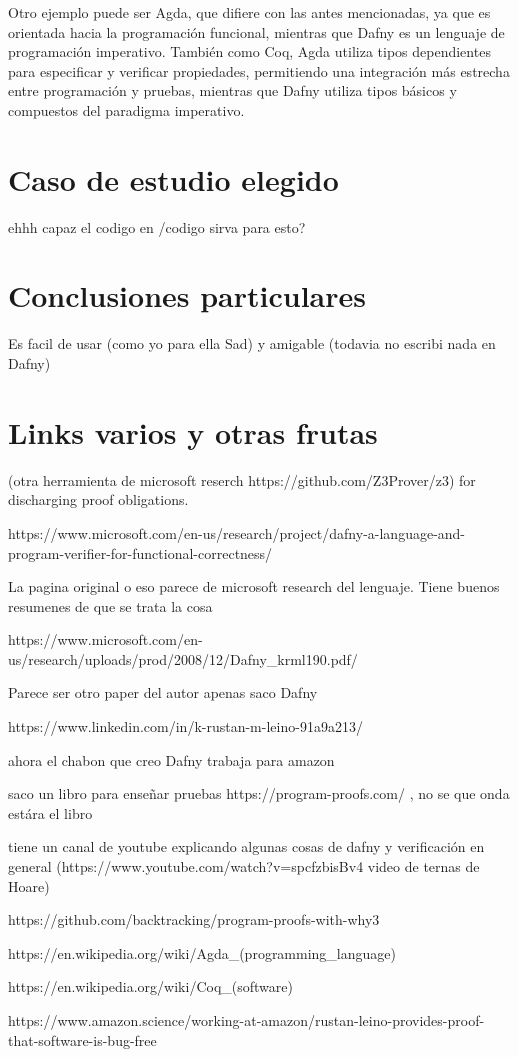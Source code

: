 \documentclass[runningheads]{llncs}
\begin{document}
Otro ejemplo puede ser Agda, que difiere con las antes mencionadas, ya que 
es orientada hacia la programación funcional, mientras que Dafny es un lenguaje de programación imperativo. 
También como Coq, Agda utiliza tipos dependientes para especificar y verificar propiedades, 
permitiendo una integración más estrecha entre programación y pruebas, mientras que Dafny utiliza tipos básicos y compuestos del paradigma imperativo.

\section{Caso de estudio elegido}
ehhh capaz el codigo en /codigo sirva para esto?

\section{Conclusiones particulares}
Es facil de usar (como yo para ella Sad) y amigable (todavia no escribi nada en Dafny)

\section{Links varios y otras frutas}
(otra herramienta de microsoft reserch https://github.com/Z3Prover/z3) for discharging proof obligations.

https://www.microsoft.com/en-us/research/project/dafny-a-language-and-program-verifier-for-functional-correctness/

La pagina original o eso parece de microsoft research del lenguaje. Tiene buenos resumenes de que se trata la cosa

https://www.microsoft.com/en-us/research/uploads/prod/2008/12/Dafny\_krml190.pdf/

Parece ser otro paper del autor apenas saco Dafny

https://www.linkedin.com/in/k-rustan-m-leino-91a9a213/

ahora el chabon que creo Dafny trabaja para amazon

saco un libro para enseñar pruebas https://program-proofs.com/ , no se que onda estára el libro

tiene un canal de youtube explicando algunas cosas de dafny y verificación en general (https://www.youtube.com/watch?v=spcfzbisBv4 video de ternas de Hoare)

https://github.com/backtracking/program-proofs-with-why3

https://en.wikipedia.org/wiki/Agda_(programming_language)

https://en.wikipedia.org/wiki/Coq_(software)

https://www.amazon.science/working-at-amazon/rustan-leino-provides-proof-that-software-is-bug-free
\end{document}
